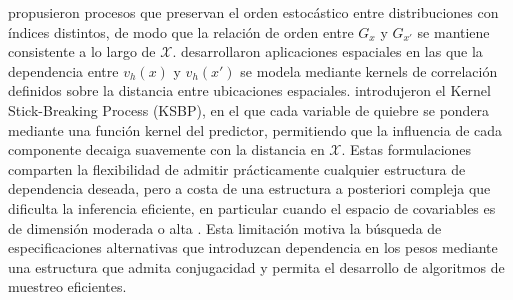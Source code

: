\citet{02_06_griffin2006order} propusieron procesos que preservan el orden estocástico entre distribuciones con índices distintos, de modo que la relación de orden entre $G_x$ y $G_{x'}$ se mantiene consistente a lo largo de $\mathcal{X}$. \citet{02_06_reich2007multivariate} desarrollaron aplicaciones espaciales en las que la dependencia entre $v_h(x)$ y $v_h(x')$ se modela mediante kernels de correlación definidos sobre la distancia entre ubicaciones espaciales. \citet{02_06_dunson2008kernel} introdujeron el Kernel Stick-Breaking Process (KSBP), en el que cada variable de quiebre se pondera mediante una función kernel del predictor, permitiendo que la influencia de cada componente decaiga suavemente con la distancia en $\mathcal{X}$. Estas formulaciones comparten la flexibilidad de admitir prácticamente cualquier estructura de dependencia deseada, pero a costa de una estructura a posteriori compleja que dificulta la inferencia eficiente, en particular cuando el espacio de covariables es de dimensión moderada o alta \cite{03_02_chung2009nonparametric}. Esta limitación motiva la búsqueda de especificaciones alternativas que introduzcan dependencia en los pesos mediante una estructura que admita conjugacidad y permita el desarrollo de algoritmos de muestreo eficientes.

